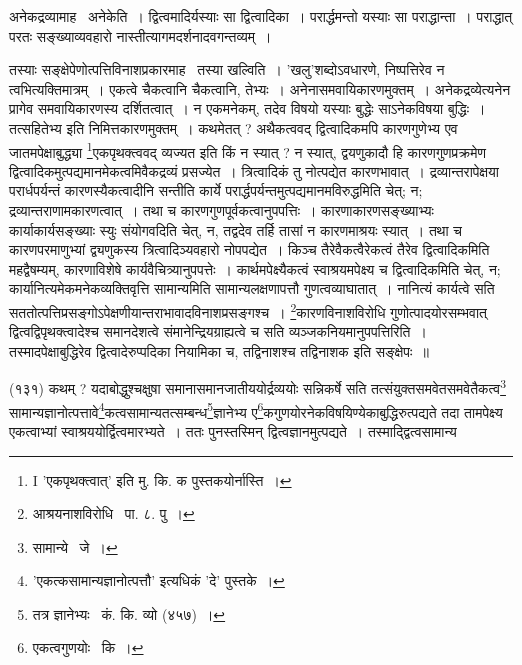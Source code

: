 \documentclass[11pt, openany]{book}
\begin{document}
{\newpage
अनेकद्रव्यामाह \textendash\ {\knu अनेकेति~।} द्वित्वमादिर्यस्याः सा द्वित्वादिका~। परार्द्धमन्तो यस्याः सा पराद्धान्ता~। पराद्धात् परतः सङ्ख्याव्यवहारो नास्तीत्यागमदर्शनादवगन्तव्यम्~।

\begin{sloppypar}
तस्याः सङ्क्षेपेणोत्पत्तिविनाशप्रकारमाह \textendash\ तस्या खल्विति~। 'खलु'शब्दोऽवधारणे, निष्पत्तिरेव न त्वभित्यक्तिमात्रम्~। एकत्वे चैकत्वानि चैकत्वानि, तेभ्यः~। अनेनासमवायिकारणमुक्तम्~। अनेकद्रव्येत्यनेन प्रागेव समवायिकारणस्य दर्शितत्वात्~। न एकमनेकम्, तदेव विषयो यस्याः बुद्धेः साऽनेकविषया बुद्धिः~। तत्सहितेभ्य इति निमित्तकारणमुक्तम्~। कथमेतत् ? अथैकत्ववद् द्वित्वादिकमपि कारणगुणेभ्य एव जातमपेक्षाबुद्ध्या \renewcommand{\thefootnote}{1}\footnote{I 'एकपृथक्त्वात्' इति मु. कि. क पुस्तकयोर्नास्ति~।}एकपृथक्त्ववद् व्यज्यत इति किं न स्यात् ? न स्यात्, द्वयणुकादौ हि कारणगुणप्रक्रमेण द्वित्वादिकमुत्पद्यमानमेकत्वमिवैकद्रव्यं प्रसज्येत~। त्रित्वादिकं तु नोत्पद्येत कारणभावात्~। द्रव्यान्तरापेक्षया परार्धपर्यन्तं कारणस्यैकत्वादीनि सन्तीति कार्ये परार्द्धपर्यन्तमुत्पद्यमानमविरुद्धमिति चेत्; न; द्रव्यान्तराणामकारणत्वात्~। तथा च कारणगुणपूर्वकत्वानुपपत्तिः~। कारणाकारणसङ्ख्याभ्यः कार्याकार्यसङ्ख्याः स्युः संयोगवदिति चेत्, न, तद्वदेव तर्हि तासां न कारणमाश्रयः स्यात्~। तथा च कारणपरमाणुभ्यां द्व्यणुकस्य त्रित्वादिञ्यवहारो नोपपद्येत~। किञ्च तैरेवैकत्वैरेकत्वं तैरेव द्वित्वादिकमिति महद्वैषम्यम्, कारणाविशेषे कार्यवैचित्र्यानुपपत्तेः~। कार्थमपेक्ष्यैकत्वं स्वाश्रयमपेक्ष्य च द्वित्वादिकमिति चेत्, न; कार्यानित्यमेकमनेकव्यक्तिवृत्ति सामान्यमिति सामान्यलक्षणापत्तौ गुणत्वव्याघातात्~। नानित्यं कार्यत्वे सति सततोत्पत्तिप्रसङ्गोऽपेक्षणीयान्तराभावादविनाशप्रसङ्गश्च~। \renewcommand{\thefootnote}{2}\footnote{आश्रयनाशविरोधि \textendash\ पा. ८. पु~।}कारणविनाशविरोधि गुणोत्पादयोरसम्भवात् द्वित्वद्विपृथक्त्वादेश्च समानदेशत्वे संमानेन्द्रियग्राह्यत्वे च सति व्यञ्जकनियमानुपपत्तिरिति~। तस्मादपेक्षाबुद्धिरेव द्वित्वादेरुप्पदिका नियामिका च, तद्विनाशश्च तद्विनाशक इति सङ्क्षेपः~॥
\end{sloppypar}

\begin{sloppypar}
\hangindent=2cm {\knu (१३१) कथम् ? यदाबोद्धुश्चक्षुषा समानासमानजातीययोर्द्रव्ययोः सन्निकर्षे सति तत्संयुक्तसमवेतसमवेतैकत्व\renewcommand{\thefootnote}{3}\footnote{सामान्ये \textendash\ जे~।} सामान्यज्ञानोत्पत्तावे\renewcommand{\thefootnote}{4}\footnote{'एकत्कसामान्यज्ञानोत्पत्तौ' इत्यधिकं 'दे' पुस्तके~।}कत्वसामान्यतत्सम्बन्ध\renewcommand{\thefootnote}{5}\footnote{तत्र ज्ञानेभ्यः \textendash\ कं. कि. व्यो (४५७)~।}ज्ञानेभ्य ए\renewcommand{\thefootnote}{6}\footnote{एकत्वगुणयोः \textendash\ कि~।}कगुणयोरनेकविषयिण्येकाबुद्धिरुत्पद्यते तदा तामपेक्ष्य एकत्वाभ्यां स्वाश्रययोर्द्वित्वमारभ्यते~। ततः पुनस्तस्मिन् द्वित्वज्ञानमुत्पद्यते~। तस्माद्द्वित्वसामान्य\textendash}
\end{sloppypar}

}
\end{document}
